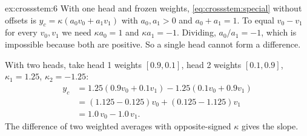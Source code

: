 \begin{solution}{ex:crossstem:6}
With one head and frozen weights, \cref{eq:crossstem:special} without offsets is $y_c = \kappa(a_0 v_0 + a_1 v_1)$ with $a_0, a_1 > 0$ and $a_0 + a_1 = 1$. To equal $v_0 - v_1$ for every $v_0, v_1$ we need $\kappa a_0 = 1$ and $\kappa a_1 = -1$. Dividing, $a_0/a_1 = -1$, which is impossible because both are positive. So a single head cannot form a difference.

With two heads, take head 1 weights $[0.9, 0.1]$, head 2 weights $[0.1, 0.9]$, $\kappa_1 = 1.25$, $\kappa_2 = -1.25$:
\begin{align*}
  y_c &= 1.25(0.9v_0 + 0.1v_1) - 1.25(0.1v_0 + 0.9v_1)\\
  &= (1.125 - 0.125)v_0 + (0.125 - 1.125)v_1\\
  &= 1.0\,v_0 - 1.0\,v_1 .
\end{align*}
The difference of two weighted averages with opposite-signed $\kappa$ gives the slope.
\end{solution}
